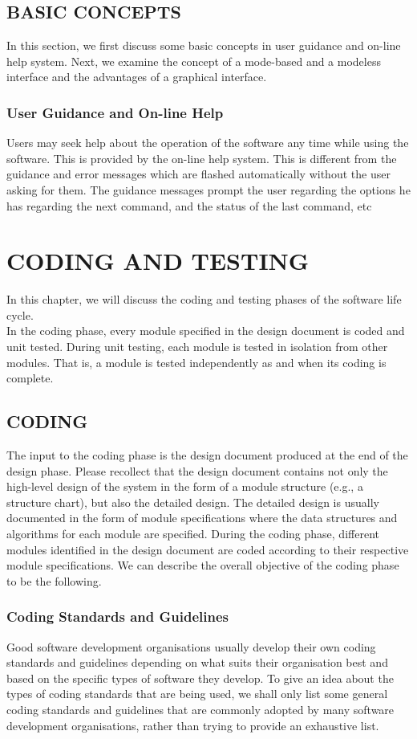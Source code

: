 \documentclass[12pt]{article}
\begin{document}
\subsection{BASIC CONCEPTS}
In this section, we first discuss some basic concepts in user guidance and
on-line help system. Next, we examine the concept of a mode-based
and a modeless interface and the advantages of a graphical interface.
\subsubsection{User Guidance and On-line Help}
Users may seek help about the operation of the software any time while
using the software. This is provided by the on-line help system. This is
different from the guidance and error messages which are flashed
automatically without the user asking for them. The guidance messages
prompt the user regarding the options he has regarding the next
command, and the status of the last command, etc
\pagebreak

\section{CODING AND TESTING}
In this chapter, we will discuss the coding and testing phases of the software
life cycle.\\
In the coding phase, every module specified in the design document is
coded and unit tested. During unit testing, each module is tested in isolation
from other modules. That is, a module is tested independently as and when
its coding is complete.
\subsection{CODING}
The input to the coding phase is the design document produced at the end of
the design phase. Please recollect that the design document contains not only
the high-level design of the system in the form of a module structure (e.g., a
structure chart), but also the detailed design. The detailed design is usually
documented in the form of module specifications where the data structures
and algorithms for each module are specified. During the coding phase,
different modules identified in the design document are coded according to
their respective module specifications. We can describe the overall objective
of the coding phase to be the following.
\subsubsection{Coding Standards and Guidelines}
Good software development organisations usually develop their own
coding standards and guidelines depending on what suits their
organisation best and based on the specific types of software they
develop. To give an idea about the types of coding standards that are
being used, we shall only list some general coding standards and
guidelines that are commonly adopted by many software development
organisations, rather than trying to provide an exhaustive list.
\end{document}

